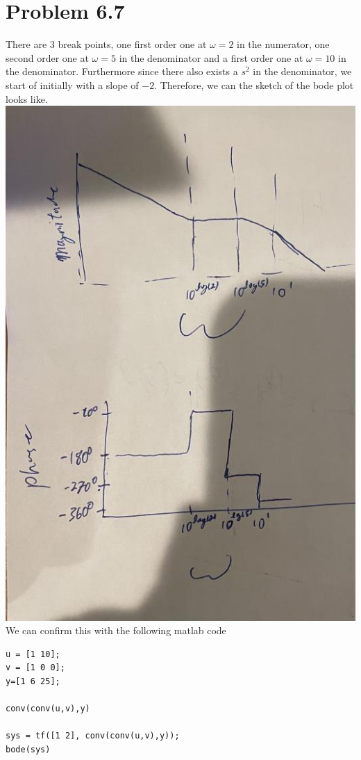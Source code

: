 \documentclass[12pt]{article}
\begin{document}
\section*{Problem 6.7}
There are 3 break points, one first order one at $\omega=2$ in the numerator, one second order one at $\omega=5$ in the denominator and a first order one at $
\omega=10$ in the denominator. Furthermore since there also exists a $s^2$ in the denominator, we start of initially with a slope of $-2$. Therefore, we can
the sketch of the bode plot looks like.\\
\includegraphics[scale=0.4]{Problem2Fig1.jpg}\\
We can confirm this with the following matlab code
\begin{verbatim}
u = [1 10];
v = [1 0 0];
y=[1 6 25];

conv(conv(u,v),y)

sys = tf([1 2], conv(conv(u,v),y));
bode(sys)
\end{verbatim}
\end{document}
